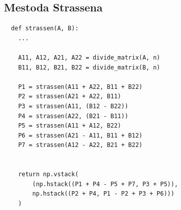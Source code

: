 \documentclass{article}
\begin{document}
\subsection{Mestoda Strassena}

\begin{lstlisting}
  def strassen(A, B):
    ...

    A11, A12, A21, A22 = divide_matrix(A, n)
    B11, B12, B21, B22 = divide_matrix(B, n)

    P1 = strassen(A11 + A22, B11 + B22)
    P2 = strassen(A21 + A22, B11)
    P3 = strassen(A11, (B12 - B22))
    P4 = strassen(A22, (B21 - B11))
    P5 = strassen(A11 + A12, B22)
    P6 = strassen(A21 - A11, B11 + B12)
    P7 = strassen(A12 - A22, B21 + B22)


    return np.vstack(
        (np.hstack((P1 + P4 - P5 + P7, P3 + P5)),
        np.hstack((P2 + P4, P1 - P2 + P3 + P6)))
    )

\end{lstlisting}
\end{document}
